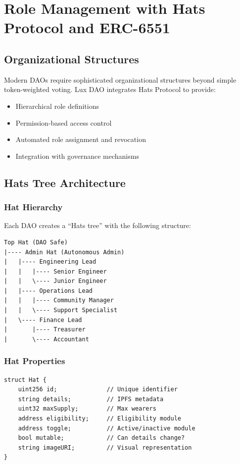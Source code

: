 \section{Role Management with Hats Protocol and ERC-6551}


\subsection{Organizational Structures}

Modern DAOs require sophisticated organizational structures beyond simple token-weighted voting. Lux DAO integrates Hats Protocol to provide:

\begin{itemize}
    \item Hierarchical role definitions
    \item Permission-based access control
    \item Automated role assignment and revocation
    \item Integration with governance mechanisms
\end{itemize}

\subsection{Hats Tree Architecture}

\subsubsection{Hat Hierarchy}

Each DAO creates a ``Hats tree'' with the following structure:

\begin{verbatim}
Top Hat (DAO Safe)
|---- Admin Hat (Autonomous Admin)
|   |---- Engineering Lead
|   |   |---- Senior Engineer
|   |   \---- Junior Engineer
|   |---- Operations Lead
|   |   |---- Community Manager
|   |   \---- Support Specialist
|   \---- Finance Lead
|       |---- Treasurer
|       \---- Accountant
\end{verbatim}

\subsubsection{Hat Properties}

\begin{lstlisting}[caption=Hat Structure]
struct Hat {
    uint256 id;              // Unique identifier
    string details;          // IPFS metadata
    uint32 maxSupply;        // Max wearers
    address eligibility;     // Eligibility module
    address toggle;          // Active/inactive module
    bool mutable;            // Can details change?
    string imageURI;         // Visual representation
}
\end{lstlisting}

